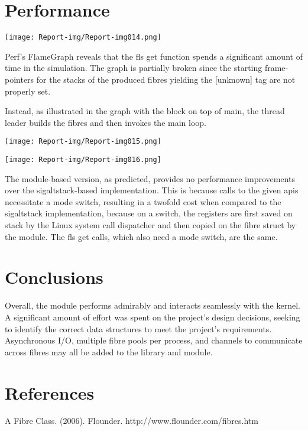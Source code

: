 \section{Performance}
 \texttt{[image: Report-img/Report-img014.png]} 

Perf's FlameGraph reveals that the fls get function spends a significant amount of time in the simulation. The graph is partially broken since the starting frame-pointers for the stacks of the produced fibres yielding the [unknown] tag are not properly set.

Instead, as illustrated in the graph with the block on top of main, the thread leader builds the fibres and then invokes the main loop.


 \texttt{[image: Report-img/Report-img015.png]} 

 \texttt{[image: Report-img/Report-img016.png]} 

The module-based version, as predicted, provides no performance improvements over the sigaltstack-based implementation. This is because calls to the given apis necessitate a mode switch, resulting in a twofold cost when compared to the sigaltstack implementation, because on a switch, the registers are first saved on stack by the Linux system call dispatcher and then copied on the fibre struct by the module. The fls get calls, which also need a mode switch, are the same.

\section{Conclusions}
Overall, the module performs admirably and interacts seamlessly with the kernel. A significant amount of effort was spent on the project's design decisions, seeking to identify the correct data structures to meet the project's requirements. Asynchronous I/O, multiple fibre pools per process, and channels to communicate across fibres may all be added to the library and module.

\section{References}
A Fibre Class. (2006). Flounder. http://www.flounder.com/fibres.htm


